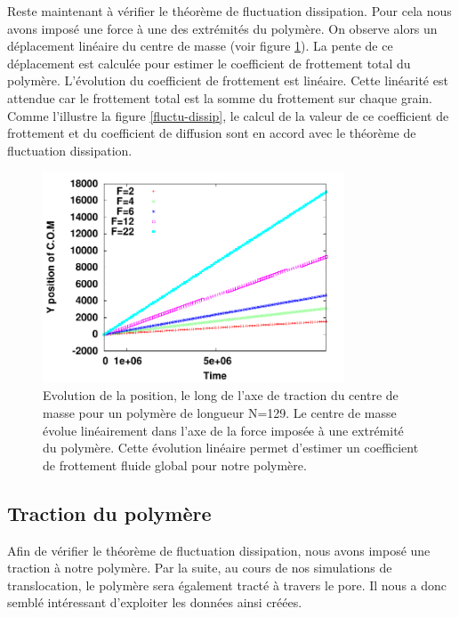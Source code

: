 Reste maintenant à vérifier le théorème de fluctuation dissipation. Pour cela nous avons imposé une force à une des extrémités du polymère. On observe alors un déplacement linéaire du centre de masse (voir figure \ref{linfrot}). La pente de ce déplacement est calculée pour estimer le coefficient de frottement total du polymère. L'évolution du coefficient de frottement est linéaire. Cette linéarité est attendue car le frottement total est la somme du frottement sur chaque grain. Comme l'illustre la figure \ref{fluctu-dissip}, le calcul de la valeur de ce coefficient de frottement et du coefficient de diffusion sont en accord avec le théorème de fluctuation dissipation.

\begin{figure}[H]
\begin{center}
\includegraphics[width=0.8\textwidth]{traction.pdf}

\caption[Résultats numériques: centre de masse en traction]{Evolution de la position, le long de l'axe de traction du centre de masse pour un polymère de longueur N=129. Le centre de masse évolue linéairement dans l'axe de la force imposée à une extrémité du polymère. Cette évolution linéaire permet d'estimer un coefficient de frottement fluide global pour notre polymère.}
\label{linfrot}
\end{center}
\end{figure}


\subsection{Traction du polymère}

Afin de vérifier le théorème de fluctuation dissipation, nous avons imposé une traction à notre polymère. Par la suite, au cours de nos simulations de translocation, le polymère sera également tracté à travers le pore. Il nous a donc semblé intéressant d'exploiter les données ainsi créées.

